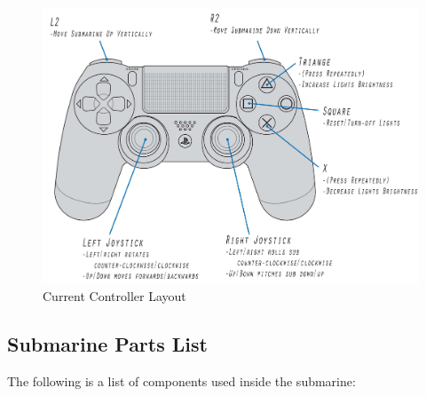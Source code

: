 \documentclass[
18pt, %
a4paper, %
oneside, %
headinclude,footinclude, %
]{scrartcl}
\begin{document}
\begin{figure}[H]
	\centering 
	\hspace*{-2.5cm}
	\includegraphics[width=1.4\columnwidth]{Figures/Component_Diagrams/dualshock_4_Layout.jpg}
	\caption[]{Current Controller Layout} %
\end{figure}

\clearpage
\newpage

\subsection{Submarine Parts List}

The following is a list of components used inside the submarine:
\end{document}

